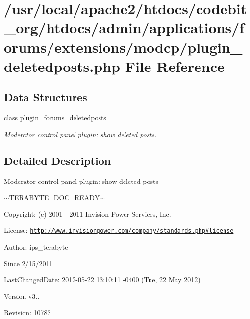 \hypertarget{plugin__deletedposts_8php}{\section{/usr/local/apache2/htdocs/codebit\-\_\-org/htdocs/admin/applications/forums/extensions/modcp/plugin\-\_\-deletedposts.php File Reference}
\label{plugin__deletedposts_8php}
}
\subsection*{Data Structures}
\begin{DoxyCompactItemize}
\item 
class \hyperlink{classplugin__forums__deletedposts}{plugin\-\_\-forums\-\_\-deletedposts}
\begin{DoxyCompactList}\small\item\em Moderator control panel plugin\-: show deleted posts. \end{DoxyCompactList}\end{DoxyCompactItemize}


\subsection{Detailed Description}
\begin{DoxyVerb}  Moderator control panel plugin: show deleted posts
\end{DoxyVerb}
 $\sim$\-T\-E\-R\-A\-B\-Y\-T\-E\-\_\-\-D\-O\-C\-\_\-\-R\-E\-A\-D\-Y$\sim$ \begin{DoxyParagraph}{Copyright\-:}
(c) 2001 -\/ 2011 Invision Power Services, Inc.
\end{DoxyParagraph}
\begin{DoxyParagraph}{License\-:}
\href{http://www.invisionpower.com/company/standards.php#license}{\tt http\-://www.\-invisionpower.\-com/company/standards.\-php\#license}
\end{DoxyParagraph}
\begin{DoxyParagraph}{Author\-:}
ips\-\_\-terabyte 
\end{DoxyParagraph}
\begin{DoxySince}{Since}
2/15/2011 
\end{DoxySince}
\begin{DoxyParagraph}{Last\-Changed\-Date\-:}
2012-\/05-\/22 13\-:10\-:11 -\/0400 (Tue, 22 May 2012) 
\end{DoxyParagraph}
\begin{DoxyVersion}{Version}
v3.. 
\end{DoxyVersion}
\begin{DoxyParagraph}{Revision\-:}
10783 
\end{DoxyParagraph}
